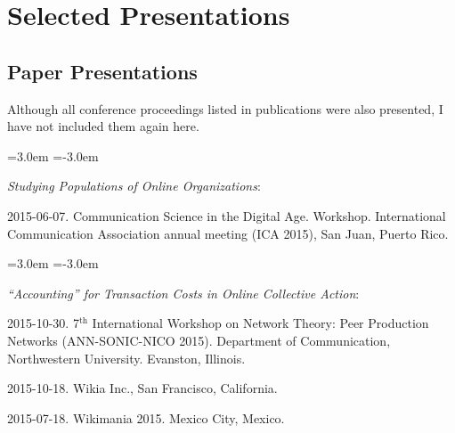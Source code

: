 \documentclass[10pt]{article}
\newenvironment{cvlist}{
\begin{list}{}{\leftmargin=3.0em \itemindent=-3.0em}
  \setlength{\itemsep}{0pt}
  \setlength{\parskip}{0em}
  \setlength{\parsep}{1em}
  \setlength{\parindent}{0em}}
{\vspace{1em}
\end{list}}
\begin{document}

\section{Selected Presentations}

\subsection{Paper Presentations}

Although all conference proceedings listed in publications were also presented, I have not included them again here.

\begin{cvlist}
\item \emph{Studying Populations of Online Organizations}:
\item 2015-06-07. Communication Science in the Digital Age. Workshop. International Communication Association annual meeting (ICA 2015), San Juan, Puerto Rico.
\end{cvlist}

\begin{cvlist}
\item \emph{“Accounting” for Transaction Costs in Online Collective Action}:
\item 2015-10-30. 7$^\mathrm{th}$ International Workshop on Network Theory: Peer Production Networks (ANN-SONIC-NICO 2015). Department of Communication, Northwestern University.  Evanston, Illinois.
\item 2015-10-18. Wikia Inc., San Francisco, California.
\item 2015-07-18. Wikimania 2015. Mexico City, Mexico.
\end{cvlist}
\end{document}
